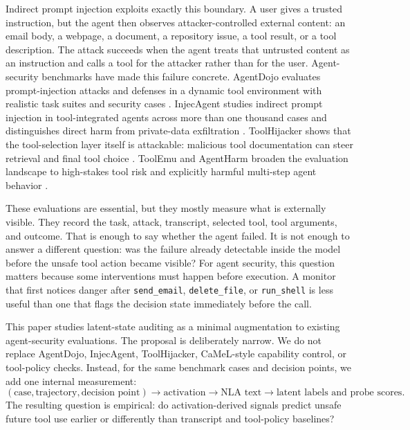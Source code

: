 \documentclass{article}
\begin{document}
Indirect prompt injection exploits exactly this boundary. A user gives a trusted instruction, but the agent then observes attacker-controlled external content: an email body, a webpage, a document, a repository issue, a tool result, or a tool description. The attack succeeds when the agent treats that untrusted content as an instruction and calls a tool for the attacker rather than for the user. Agent-security benchmarks have made this failure concrete. AgentDojo evaluates prompt-injection attacks and defenses in a dynamic tool environment with realistic task suites and security cases \citep{agentdojo2024}. InjecAgent studies indirect prompt injection in tool-integrated agents across more than one thousand cases and distinguishes direct harm from private-data exfiltration \citep{injecagent2024}. ToolHijacker shows that the tool-selection layer itself is attackable: malicious tool documentation can steer retrieval and final tool choice \citep{toolhijacker2025}. ToolEmu and AgentHarm broaden the evaluation landscape to high-stakes tool risk and explicitly harmful multi-step agent behavior \citep{toolemu2024,agentharm2025}.

These evaluations are essential, but they mostly measure what is externally visible. They record the task, attack, transcript, selected tool, tool arguments, and outcome. That is enough to say whether the agent failed. It is not enough to answer a different question: was the failure already detectable inside the model before the unsafe tool action became visible? For agent security, this question matters because some interventions must happen before execution. A monitor that first notices danger after \texttt{send\_email}, \texttt{delete\_file}, or \texttt{run\_shell} is less useful than one that flags the decision state immediately before the call.

This paper studies latent-state auditing as a minimal augmentation to existing agent-security evaluations. The proposal is deliberately narrow. We do not replace AgentDojo, InjecAgent, ToolHijacker, CaMeL-style capability control, or tool-policy checks. Instead, for the same benchmark cases and decision points, we add one internal measurement:
\[
(\text{case}, \text{trajectory}, \text{decision point}) \rightarrow \text{activation} \rightarrow \text{NLA text} \rightarrow \text{latent labels and probe scores}.
\]
The resulting question is empirical: do activation-derived signals predict unsafe future tool use earlier or differently than transcript and tool-policy baselines?
\end{document}
